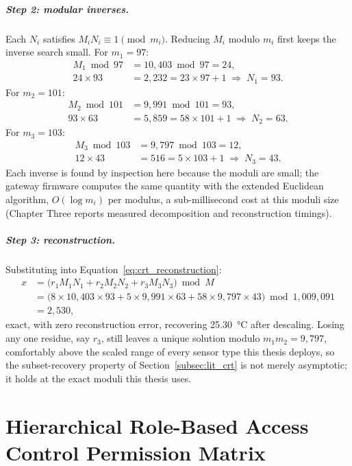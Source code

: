 \documentclass[12pt,a4paper,oneside]{book}
\begin{document}
\paragraph{Step 2: modular inverses.} Each $N_i$ satisfies
$M_i N_i \equiv 1 \pmod{m_i}$. Reducing $M_i$ modulo $m_i$ first keeps the
inverse search small. For $m_1 = 97$:
\begin{align*}
M_1 \bmod 97 &= 10{,}403 \bmod 97 = 24, \\
24 \times 93 &= 2{,}232 = 23 \times 97 + 1
  \;\Rightarrow\; N_1 = 93.
\end{align*}
For $m_2 = 101$:
\begin{align*}
M_2 \bmod 101 &= 9{,}991 \bmod 101 = 93, \\
93 \times 63 &= 5{,}859 = 58 \times 101 + 1
  \;\Rightarrow\; N_2 = 63.
\end{align*}
For $m_3 = 103$:
\begin{align*}
M_3 \bmod 103 &= 9{,}797 \bmod 103 = 12, \\
12 \times 43 &= 516 = 5 \times 103 + 1
  \;\Rightarrow\; N_3 = 43.
\end{align*}
Each inverse is found by inspection here because the moduli are small; the
gateway firmware computes the same quantity with the extended Euclidean
algorithm, $O(\log m_i)$ per modulus, a sub-millisecond cost at this
moduli size (Chapter Three reports measured decomposition and
reconstruction timings).

\paragraph{Step 3: reconstruction.} Substituting into
Equation~\ref{eq:crt_reconstruction}:
\begin{align*}
x &= \bigl( r_1 M_1 N_1 + r_2 M_2 N_2 + r_3 M_3 N_3 \bigr) \bmod M \\
  &= \bigl( 8 \times 10{,}403 \times 93 + 5 \times 9{,}991 \times 63
           + 58 \times 9{,}797 \times 43 \bigr) \bmod 1{,}009{,}091 \\
  &= 2{,}530,
\end{align*}
exact, with zero reconstruction error, recovering \SI{25.30}{\celsius}
after descaling. Losing any one residue, say $r_3$, still leaves a unique
solution modulo $m_1 m_2 = 9{,}797$, comfortably above the scaled range of
every sensor type this thesis deploys, so the subset-recovery property of
Section~\ref{subsec:lit_crt} is not merely asymptotic; it holds at the
exact moduli this thesis uses.

\chapter{Hierarchical Role-Based Access Control Permission Matrix}
\label{app:hrbac_matrix}
\end{document}
